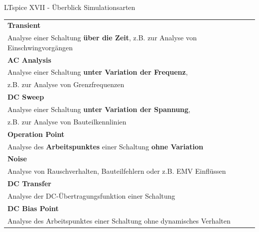\documentclass{beamer}
\begin{document}
\begin{frame}{LTspice XVII - Überblick Simulationsarten}

  \begin{scriptsize}
    \begin{tabular}{ l }
      \hline
      \textbf{Transient}                                                                       \\
      Analyse einer Schaltung \textbf{über die Zeit}, z.B. zur Analyse von Einschwingvorgängen \\
      \hline
      \textbf{AC Analysis}                                                                     \\
      Analyse einer Schaltung \textbf{unter Variation der Frequenz},                           \\ z.B. zur Analyse von Grenzfrequenzen\\
      \hline
      \textbf{DC Sweep}                                                                        \\
      Analyse einer Schaltung \textbf{unter Variation der Spannung},                           \\ z.B. zur Analyse von Bauteilkennlinien\\
      \hline
      \textbf{Operation Point}                                                                 \\
      Analyse des \textbf{Arbeitspunktes} einer Schaltung \textbf{ohne Variation}              \\
      \hline
      \textbf{Noise}                                                                           \\
      Analyse von Rauschverhalten, Bauteilfehlern oder z.B. EMV Einflüssen                     \\
      \hline
      \textbf{DC Transfer}                                                                     \\
      Analyse der DC-Übertragungsfunktion einer Schaltung                                      \\
      \hline
      \textbf{DC Bias Point}                                                                   \\
      Analyse des Arbeitspunktes einer Schaltung ohne dynamisches Verhalten                    \\
      \hline
    \end{tabular}
  \end{scriptsize}

\end{frame}
\end{document}

